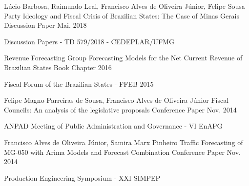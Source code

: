 \begin{cventries}

  \cventry
    {Lúcio Barbosa, Raimundo Leal, Francisco Alves de Oliveira Júnior, Felipe Sousa}
    {Party Ideology and Fiscal Crisis of Brazilian States: The Case of Minas Gerais}
    {Discussion Paper}
    {Mai. 2018}
    {
      \begin{cvitems}
        \item {Discussion Papers - TD 579/2018 - CEDEPLAR/UFMG}
      \end{cvitems}
    }

  \cventry
    {Revenue Forecasting Group}
    {Forecasting Models for the Net Current Revenue of Brazilian States}
    {Book Chapter}
    {2016}
    {
      \begin{cvitems}
        \item {Fiscal Forum of the Brazilian States - FFEB 2015}
      \end{cvitems}
    }

  \cventry
    {Felipe Magno Parreiras de Sousa, Francisco Alves de Oliveira Júnior} 
    {Fiscal Councils: An analysis of the legislative proposals}
    {Conference Paper}
    {Nov. 2014}
    {
      \begin{cvitems}
        \item {ANPAD Meeting of Public Administration and Governance - VI EnAPG}
      \end{cvitems}
    }


  \cventry
    {Francisco Alves de Oliveira Júnior, Samira Marx Pinheiro}
    {Traffic Forecasting of MG-050 with Arima Models and Forecast Combination}
    {Conference Paper}
    {Nov. 2014}
    {
      \begin{cvitems}
        \item {Production Engineering Symposium - XXI SIMPEP}
      \end{cvitems}
    }


\end{cventries}